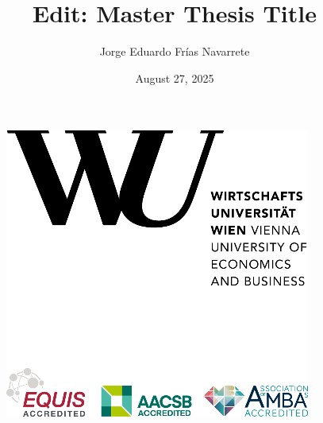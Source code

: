 \documentclass[
  12pt,
  a4paper,
  openany]{scrbook}
\title{Edit: Master Thesis Title}
\author{Jorge Eduardo Frías Navarrete}
\date{August 27, 2025}
\begin{document}
\frontmatter


\thispagestyle{empty}
\begin{figure}[h!]
    \raggedleft
    \includegraphics[scale=0.9]{pictures/WULogo.png}
\end{figure}

\vspace{1em}
\end{document}
